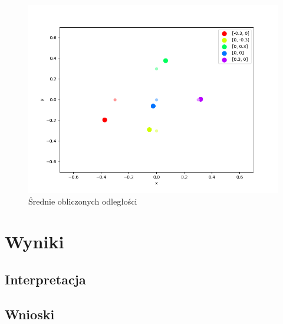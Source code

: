 \begin{figure}[h]
    \includegraphics[width=.49\textwidth]{pics/mult_lat_2d_num/positions_8_mean.png}
\caption{Średnie obliczonych odległości}
\end{figure}

\section{Wyniki}

\subsection{Interpretacja}

\subsection{Wnioski}